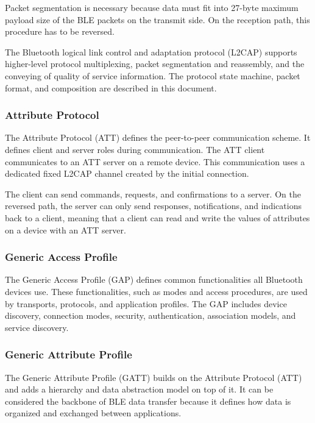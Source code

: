 Packet segmentation is necessary because data must fit into 27-byte maximum
payload size of the BLE packets on the transmit side. \cite{Townsend14}
On the reception path, this procedure has to be reversed.

The Bluetooth logical link control and adaptation protocol (L2CAP) supports
higher-level protocol multiplexing, packet segmentation and reassembly,
and the conveying of quality of service information.
The protocol state machine, packet format, and composition are described
in this document. \cite{Townsend14}

\subsubsection{Attribute Protocol}
\label{ble:host:att}
The Attribute Protocol (ATT) defines the peer-to-peer communication scheme. It defines client and server roles during communication. The ATT client communicates to an ATT server on a remote device. This communication uses a dedicated fixed L2CAP channel created by the initial connection.

The client can send commands, requests, and confirmations to a server. On the reversed path, the server can only send responses, notifications, and indications back to a client, meaning that a client can read and write the values of attributes on a device with an ATT server.

\subsubsection{Generic Access Profile}
\label{ble:host:gap}

The Generic Access Profile (GAP) defines common functionalities all Bluetooth devices use.
These functionalities, such as modes and access procedures, are used by transports, protocols, and application profiles.
The GAP includes device discovery, connection modes, security, authentication, association models, and service discovery.

\subsubsection{Generic Attribute Profile}
\label{ble:host:gatt}
The Generic Attribute Profile (GATT) builds on the Attribute Protocol (ATT) and adds a hierarchy and data abstraction model on top of it.
It can be considered the backbone of BLE data transfer because it defines how data is organized and exchanged between applications.

